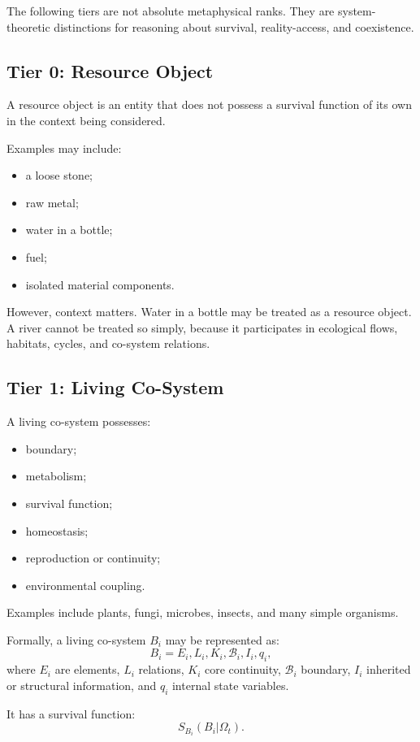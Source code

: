 \documentclass[11pt,a4paper]{article}
\begin{document}
The following tiers are not absolute metaphysical ranks. They are system-theoretic distinctions for reasoning about survival, reality-access, and coexistence.

\subsection{Tier 0: Resource Object}

A resource object is an entity that does not possess a survival function of its own in the context being considered.

Examples may include:
\begin{itemize}[leftmargin=2em]
\item a loose stone;
\item raw metal;
\item water in a bottle;
\item fuel;
\item isolated material components.
\end{itemize}

However, context matters. Water in a bottle may be treated as a resource object. A river cannot be treated so simply, because it participates in ecological flows, habitats, cycles, and co-system relations.

\subsection{Tier 1: Living Co-System}

A living co-system possesses:
\begin{itemize}[leftmargin=2em]
\item boundary;
\item metabolism;
\item survival function;
\item homeostasis;
\item reproduction or continuity;
\item environmental coupling.
\end{itemize}

Examples include plants, fungi, microbes, insects, and many simple organisms.

Formally, a living co-system $B_i$ may be represented as:
\[
B_i={E_i,L_i,K_i,\mathcal{B}_i,I_i,q_i},
\]
where $E_i$ are elements, $L_i$ relations, $K_i$ core continuity, $\mathcal{B}_i$ boundary, $I_i$ inherited or structural information, and $q_i$ internal state variables.

It has a survival function:
\[
S_{B_i}(B_i|\Omega_t).
\]
\end{document}
